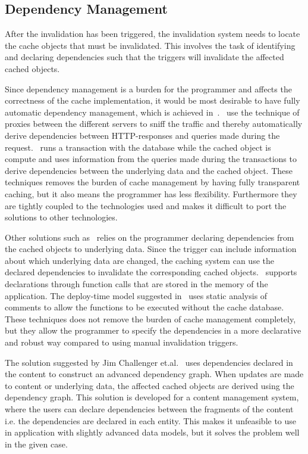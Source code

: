 
\subsection{Dependency Management}
\label{subsubsec:dependency-management}

After the invalidation has been triggered, the invalidation system needs to locate the cache objects that must be invalidated. This involves the task of identifying and declaring dependencies such that the triggers will invalidate the affected cached objects.

Since dependency management is a burden for the programmer and affects the correctness of the cache implementation, it would be most desirable to have fully automatic dependency management, which is achieved in~\cite{paper:liskov, paper:db-driven-http}.~\cite{paper:db-driven-http} use the technique of proxies between the different servers to sniff the traffic and thereby automatically derive dependencies between HTTP-responses and queries made during the request.~\cite{paper:liskov} runs a transaction with the database while the cached object is compute and uses information from the queries made during the transactions to derive dependencies between the underlying data and the cached object. These techniques removes the burden of cache management by having fully transparent caching, but it also means the programmer has less flexibility. Furthermore they are tightly coupled to the technologies used and makes it difficult to port the solutions to other technologies.

Other solutions such as~\cite{paper:cache-genie, paper:deploy-time} relies on the programmer declaring dependencies from the cached objects to underlying data. Since the trigger can include information about which underlying data are changed, the caching system can use the declared dependencies to invalidate the corresponding cached objects.~\cite{paper:cache-genie} supports declarations through function calls that are stored in the memory of the application. The deploy-time model suggested in~\cite{paper:deploy-time} uses static analysis of comments to allow the functions to be executed without the cache database. These techniques does not remove the burden of cache management completely, but they allow the programmer to specify the dependencies in a more declarative and robust way compared to using manual invalidation triggers.

The solution suggested by Jim Challenger et.al.~\cite{paper:ibm, paper:ibm-extended} uses dependencies declared in the content to construct an advanced dependency graph. When updates are made to content or underlying data, the affected cached objects are derived using the dependency graph. This solution is developed for a content management system, where the users can declare dependencies between the fragments of the content i.e. the dependencies are declared in each entity. This makes it unfeasible to use in application with slightly advanced data models, but it solves the problem well in the given case.

